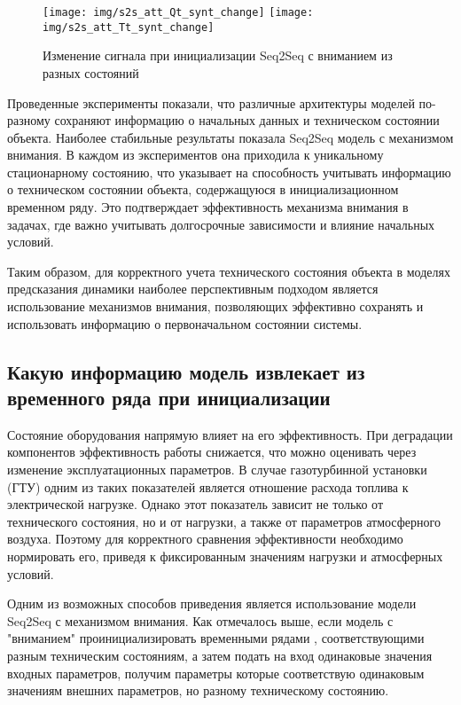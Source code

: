 \documentclass[12pt,a4paper]{article}
\begin{document}
\begin{figure}[htbp]
	\centering\texttt{[image: img/s2s\_att\_Qt\_synt\_change]}
	\centering\texttt{[image: img/s2s\_att\_Tt\_synt\_change]}
	\caption{Изменение сигнала при инициализации Seq2Seq с вниманием из разных состояний}
	\label{fig:s2s_att_Qt_Tt_synt_change}
\end{figure}


Проведенные эксперименты показали, что различные архитектуры моделей по-разному сохраняют информацию о начальных данных и техническом состоянии объекта. Наиболее стабильные результаты показала Seq2Seq модель с механизмом внимания. В каждом из экспериментов она приходила к уникальному стационарному состоянию, что указывает на способность учитывать информацию о техническом состоянии объекта, содержащуюся в инициализационном временном ряду. Это подтверждает эффективность механизма внимания в задачах, где важно учитывать долгосрочные зависимости и влияние начальных условий.

Таким образом, для корректного учета технического состояния объекта в моделях предсказания динамики наиболее перспективным подходом является использование механизмов внимания, позволяющих эффективно сохранять и использовать информацию о первоначальном состоянии системы.


\newpage
\subsection{Какую информацию модель извлекает из временного ряда при инициализации}


Состояние оборудования напрямую влияет на его эффективность. При деградации компонентов эффективность работы снижается, что можно оценивать через изменение эксплуатационных параметров. В случае газотурбинной установки (ГТУ) одним из таких показателей является отношение расхода топлива к электрической нагрузке. Однако этот показатель зависит не только от технического состояния, но и от нагрузки, а также от параметров атмосферного воздуха. Поэтому для корректного сравнения эффективности необходимо нормировать его, приведя к фиксированным значениям нагрузки и атмосферных условий.

Одним из возможных способов приведения является использование модели Seq2Seq с механизмом внимания. Как отмечалось выше, если модель с "вниманием" проинициализировать временными рядами , соответствующими разным техническим состояниям, а затем подать на вход одинаковые значения входных параметров, получим параметры которые соответствую одинаковым значениям внешних параметров, но разному техническому состоянию.
\end{document}
